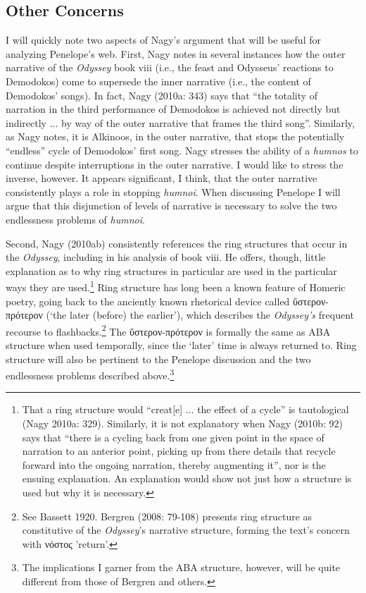 \documentclass[12pt]{article}
\begin{document}
\noindent \hfill \par
\subsection{Other Concerns}

I will quickly note two aspects of Nagy's argument that will be useful for analyzing Penelope's web. First, Nagy notes in several instances how the outer narrative of the \textit{Odyssey} book viii (i.e., the feast and Odysseus' reactions to Demodokos) come to supersede the inner narrative (i.e., the content of Demodokos' songs). In fact, Nagy (2010a: 343) says that ``the totality of narration in the third performance of Demodokos is achieved not directly but indirectly ... by way of the outer narrative that frames the third song''. Similarly, as Nagy notes, it is Alkinoos, in the outer narrative, that stops the potentially ``endless'' cycle of Demodokos' first song. Nagy stresses the ability of a \textit{humnos} to continue despite interruptions in the outer narrative. I would like to stress the inverse, however. It appears significant, I think, that the outer narrative consistently plays a role in stopping \textit{humnoi}. When discussing Penelope I will argue that this disjunction of levels of narrative is necessary to solve the two endlessness problems of \textit{humnoi}.

Second, Nagy (2010ab) consistently references the ring structures that occur in the \textit{Odyssey}, including in his analysis of book viii. He offers, though, little explanation as to why ring structures in particular are used in the particular ways they are used.\footnote{ That a ring structure would ``creat[e] ... the effect of a cycle'' is tautological (Nagy 2010a: 329). Similarly, it is not explanatory when Nagy (2010b: 92) says that ``there is a cycling back from one given point in the space of narration to an anterior point, picking up from there details that recycle forward into the ongoing narration, thereby augmenting it'', nor is the ensuing explanation. An explanation would show not just how a structure is used but why it is necessary.} Ring structure has long been a known feature of Homeric poetry, going back to the anciently known rhetorical device called ὕστερον-πρότερον (`the later (before) the earlier'), which describes the \textit{Odyssey's} frequent recourse to flashbacks.\footnote{ See Bassett 1920. Bergren (2008: 79-108) presents ring structure as constitutive of the \textit{Odyssey}'s narrative structure, forming the text's concern with νόστος 'return'.} The ὕστερον-πρότερον is formally the same as ABA structure when used temporally, since the `later' time is always returned to. Ring structure will also be pertinent to the Penelope discussion and the two endlessness problems described above.\footnote{ The implications I garner from the ABA structure, however, will be quite different from those of Bergren and others.} 
\end{document}
